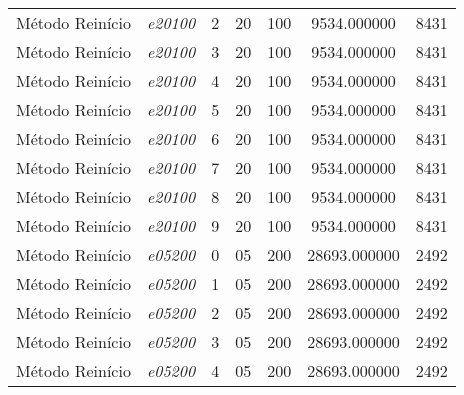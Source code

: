 {\begin{longtable}{cc|c|cc|cc}
			Método Reinício    & \textit{e20100}    & 2                               & 20               & 100              & 9534.000000                          & 8431 \\ 
			Método Reinício    & \textit{e20100}    & 3                               & 20               & 100              & 9534.000000                          & 8431 \\ 
			Método Reinício    & \textit{e20100}    & 4                               & 20               & 100              & 9534.000000                          & 8431 \\ 
			Método Reinício    & \textit{e20100}    & 5                               & 20               & 100              & 9534.000000                          & 8431 \\ 
			Método Reinício    & \textit{e20100}    & 6                               & 20               & 100              & 9534.000000                          & 8431 \\ 
			Método Reinício    & \textit{e20100}    & 7                               & 20               & 100              & 9534.000000                          & 8431 \\ 
			Método Reinício    & \textit{e20100}    & 8                               & 20               & 100              & 9534.000000                          & 8431 \\ 
			Método Reinício    & \textit{e20100}    & 9                               & 20               & 100              & 9534.000000                          & 8431 \\ \hline
			Método Reinício    & \textit{e05200}    & 0                               & 05               & 200              & 28693.000000                          & 2492 \\ 
			Método Reinício    & \textit{e05200}    & 1                               & 05               & 200              & 28693.000000                          & 2492 \\ 
			Método Reinício    & \textit{e05200}    & 2                               & 05               & 200              & 28693.000000                          & 2492 \\ 
			Método Reinício    & \textit{e05200}    & 3                               & 05               & 200              & 28693.000000                          & 2492 \\ 
			Método Reinício    & \textit{e05200}    & 4                               & 05               & 200              & 28693.000000                          & 2492 \\ 

\end{longtable}}
